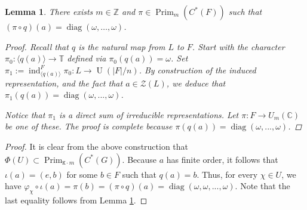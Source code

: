\documentclass[10pt,a4paper]{amsart}
\newtheorem{lemma}{Lemma}
\newcommand{\C}{\mathbb{C}}
\DeclareMathOperator{\Prim}{Prim}
\newcommand{\TT}{\mathbb{T}}
\DeclareMathOperator{\U}{U}
\newcommand{\Z}{\mathbb{Z}}
\newcommand{\ZZ}{\mathcal{Z}}
\DeclareMathOperator{\diag}{diag}
\DeclareMathOperator{\ind}{ind}
\newcommand{\mt}{\mathtt}
\begin{document}
\begin{lemma}\label{existance of irrep on finite group}
  There exists $m\in \Z$ and $\pi\in \Prim_m(C^*(F))$ such that $(\pi \circ q)(a)=\diag(\omega,\ldots,\omega)$.
  \begin{proof}
      Recall that $q$ is the natural map from $L$ to $F$. Start with the character $\pi_0 \colon \langle q(a)\rangle\to \TT$ defined via $\pi_0(q(a))=\omega$. Set $\pi_1:=\ind_{\langle q(a)\rangle}^F \pi_0:L\to \U(|F|/n)$. By construction of the induced representation, and the fact that $a\in \ZZ(L)$, we deduce that $\pi_1(q(a))=\diag(\omega,...,\omega)$. \par

      
      Notice that $\pi_1$ is a direct sum of irreducible representations. Let $\pi \colon F\to U_m(\C)$ be one of these. The proof is complete because $\pi(q(a))=\diag(\omega,...,\omega)$.
  \end{proof}
\end{lemma}

    \begin{proof}
        It is clear from the above construction that $\Phi(U)\subset \Prim_{\mt{K}\cdot m}(C^*(G))$. Because $a$ has finite order, it follows that $\iota(a)=(e,b)$ for some $b\in F$ such that $q(a)=b$. Thus, for every $\chi\in U$, we have $\varphi_{\chi}\circ \iota(a)=\pi(b)=(\pi\circ q)(a)=\diag(\omega,\omega,...,\omega)$. Note that the last equality follows from Lemma \ref{existance of irrep on finite group}. 
    \end{proof}
\end{document}
